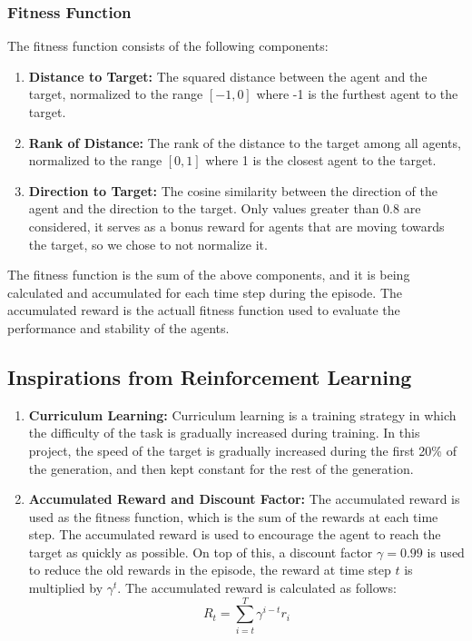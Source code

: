 \documentclass[sigconf]{acmart}
\begin{document}
\subsubsection{Fitness Function}
The fitness function consists of the following components:
\begin{enumerate}
  \item \textbf{Distance to Target:} The squared distance between the agent and the target, normalized to the range $[-1, 0]$ where -1 is the furthest agent to the target.
  \item \textbf{Rank of Distance:} The rank of the distance to the target among all agents, normalized to the range $[0, 1]$ where 1 is the closest agent to the target.
  \item \textbf{Direction to Target:} The cosine similarity between the direction of the agent and the direction to the target. Only values greater than 0.8 are considered, it serves as a bonus reward for agents that are moving towards the target, so we chose to not normalize it.
\end{enumerate}
The fitness function is the sum of the above components, and it is being calculated and accumulated for each time step during the episode.
The accumulated reward is the actuall fitness function used to evaluate the performance and stability of the agents.
\subsection{Inspirations from Reinforcement Learning}
\begin{enumerate}
  \item \textbf{Curriculum Learning:} Curriculum learning is a training strategy in which the difficulty of the task is gradually increased during training. In this project, the speed of the target is gradually increased during the first 20\% of the generation, and then kept constant for the rest of the generation.
  \item \textbf{Accumulated Reward and Discount Factor:} The accumulated reward is used as the fitness function, which is the sum of the rewards at each time step. The accumulated reward is used to encourage the agent to reach the target as quickly as possible. On top of this, a discount factor $\gamma = 0.99$ is used to reduce the old rewards in the episode, the reward at time step $t$ is multiplied by $\gamma^t$. The accumulated reward is calculated as follows:
  \begin{equation}
    R_t = \sum_{i=t}^{T} \gamma^{i-t} r_i
    \label{eq:discount}
  \end{equation}
\end{enumerate}
\end{document}
